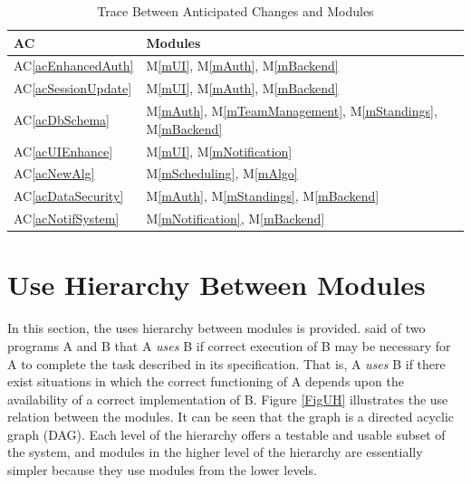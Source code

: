 \documentclass[12pt, titlepage]{article}
\newcommand{\acref}[1]{AC\ref{#1}}
\newcommand{\mref}[1]{M\ref{#1}}
\begin{document}
\begin{table}[H]
  \centering
  \begin{tabular}{p{} p{}}
    \toprule
    \textbf{AC}             & \textbf{Modules}                                                         \\
    \midrule
    \acref{acEnhancedAuth}  & \mref{mUI}, \mref{mAuth}, \mref{mBackend}                                \\
    \acref{acSessionUpdate} & \mref{mUI}, \mref{mAuth}, \mref{mBackend}                                \\
    \acref{acDbSchema}      & \mref{mAuth}, \mref{mTeamManagement}, \mref{mStandings}, \mref{mBackend} \\
    \acref{acUIEnhance}     & \mref{mUI}, \mref{mNotification}                                         \\
    \acref{acNewAlg}        & \mref{mScheduling}, \mref{mAlgo}                                         \\
    \acref{acDataSecurity}  & \mref{mAuth}, \mref{mStandings}, \mref{mBackend}                         \\
    \acref{acNotifSystem}   & \mref{mNotification}, \mref{mBackend}                                    \\
    \bottomrule
  \end{tabular}
  \caption{Trace Between Anticipated Changes and Modules}
  \label{TblACT}
\end{table}

\section{Use Hierarchy Between Modules} \label{SecUse}

In this section, the uses hierarchy between modules is
provided. \citet{Parnas1978} said of two programs A and B that A {\em uses} B if
correct execution of B may be necessary for A to complete the task described in
its specification. That is, A {\em uses} B if there exist situations in which
the correct functioning of A depends upon the availability of a correct
implementation of B.  Figure \ref{FigUH} illustrates the use relation between
the modules. It can be seen that the graph is a directed acyclic graph
(DAG). Each level of the hierarchy offers a testable and usable subset of the
system, and modules in the higher level of the hierarchy are essentially simpler
because they use modules from the lower levels.
\end{document}
